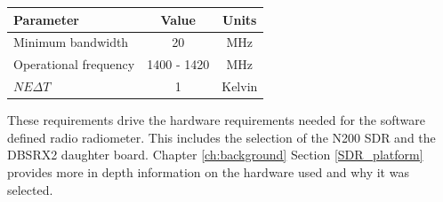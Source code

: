 \begin{table}[h!tb] \centering
{}
\label{rad_performance}
\begin{tabular}{lcc} \hline
\textbf{Parameter} & \textbf{Value} & \textbf{Units} \\ \hline
Minimum bandwidth & 20 & MHz \\
Operational frequency & 1400 - 1420 & MHz \\
$NE\Delta T$ & 1 & Kelvin \\ \hline
\end{tabular}
\end{table}

These requirements drive the hardware requirements needed for the software defined radio radiometer.  This includes the selection of the N200 SDR and the DBSRX2 daughter board.  Chapter \ref{ch:background} Section \ref{SDR_platform} provides more in depth information on the hardware used and why it was selected.





